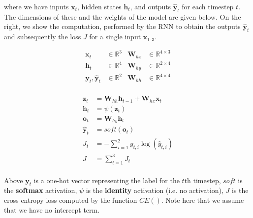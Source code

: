 \documentclass[11pt,addpoints,answers]{exam}
\newcommand{\hv}{\mathbf{h}}
\newcommand{\ov}{\mathbf{o}}
\newcommand{\xv}{\mathbf{x}}
\newcommand{\yv}{\mathbf{y}}
\newcommand{\zv}{\mathbf{z}}
\newcommand{\Wv}{\mathbf{W}}
\begin{document}
\begin{questions}
\begin{parts}
\begin{center}
\end{center}
where we have inputs $\xv_t$, hidden states $\hv_t$, and outputs $\hat{\yv}_t$ for each timestep $t$. The dimensions of these and the weights of the model are given below. On the right, we show the computation, performed by the RNN to obtain the outputs $\hat{\yv}_t$ and subsequently the loss $J$ for a single input $\xv_{1:3}$. 

\begin{minipage}{0.5\linewidth}
\begin{align*}
    \xv_t &\in \mathbb{R}^3 &\Wv_{hx} &\in \mathbb{R}^{4 \times 3}\\
    \hv_t &\in \mathbb{R}^4 &\Wv_{hy} &\in \mathbb{R}^{2 \times 4}\\
    \yv_t, \hat{\yv}_t &\in \mathbb{R}^2 &\Wv_{hh} &\in \mathbb{R}^{4 \times 4}\\
\end{align*}
\end{minipage}
\begin{minipage}{0.5\linewidth}    
\begin{align*}
    \zv_t &= \Wv_{hh} \hv_{t-1} + \Wv_{hx}\xv_t\\
    \hv_t &= \psi(\zv_t)\\
    \ov_t &= \Wv_{hy}\hv_t\\
    \hat{\yv}_t &= soft(\ov_t)\\
    J_t &= -\sum_{i=1}^2 y_{t,i} \log(\hat{y}_{t,i})\\
    J &= \sum_{t=1}^3 J_t\\
\end{align*}
\end{minipage}

Above $\yv_t$ is a one-hot vector representing the label for the $t$th timestep, $soft$ is the \textbf{softmax} activation, $\psi$ is the \textbf{identity} activation (i.e. no activation), $J$ is the cross entropy loss computed by the function $CE()$. Note here that we assume that we have no intercept term. 


\end{parts}
\end{questions}
\end{document}
